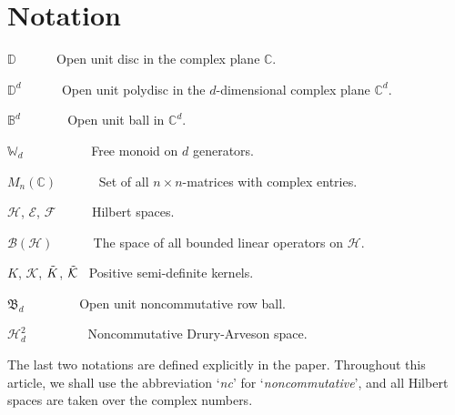 \documentclass[12pt]{amsart}%
\numberwithin{equation}{section}
\newcommand{\bB}{\mathbb{B}}
\newcommand{\bW}{\mathbb{W}}
\newcommand{\fB}{{\mathfrak{B}}}
\newcommand{\clb}{\mathcal{B}}
\newcommand{\cle}{\mathcal{E}}
\newcommand{\clf}{\mathcal{F}}
\newcommand{\clh}{\mathcal{H}}
\newcommand{\clk}{\mathcal{K}}
\newcommand{\D}{\mathbb{D}}
\newcommand{\C}{\mathbb{C}}
\begin{document}
\section*{Notation}
\begin{list}{\quad}{}
\item $\mathbb{D}$ \quad \quad \quad\,\,\, \, \,  \ \ Open unit disc in the complex plane
$\mathbb{C}$.

\item  $\mathbb{D}^d$ \; \quad \quad\,\,\, \, \,  \  \ Open unit polydisc in the $d$-dimensional complex plane $\mathbb{C}^d$.

\item $\bB^d$\; \quad\quad\,\ \,\, \, \, \ \ Open unit ball in  $\C^d$.

\item  $\bW_d$\; \, \, \, \, \, \, \, \, \ \ Free monoid on $d$ generators.

\item $M_n(\C)$\; \, \, \, \, \, \,   Set of all $n\times n$-matrices with complex entries.

\item  $\clh$, $\cle$, $\clf$ \; \, \, \, \ \ Hilbert spaces.

\item $\clb(\clh)$ \quad \;\,\,\, \, \, \, \ The space of all bounded linear
operators on $\clh$.

\item  $K$, $\clk$, $\Tilde{K}$, $\Tilde{\clk}$  \; \,  Positive semi-definite kernels.

\item $\fB_d$ \; \; \, \, \, \, \, \, \, \  Open unit noncommutative row ball.

\item $\clh^2_d$\; \; \, \, \, \, \, \, \,  \ \ Noncommutative Drury-Arveson space.









\end{list}

The last two notations are defined explicitly in the paper. Throughout this article, we shall use the abbreviation `\textit{nc}' for `\textit{noncommutative}', and all Hilbert spaces are taken over the complex numbers.
\end{document}
